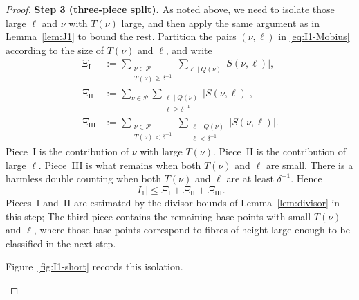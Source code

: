 \begin{proof}
\smallskip\noindent\textbf{Step 3 (three-piece split).}
As noted above, we need to isolate those large $\ell$ and $\nu$ with $T(\nu)$ large, and then apply the same argument as in Lemma~\ref{lem:J1} to bound the rest.
Partition the pairs $(\nu,\ell)$ in \eqref{eq:I1-Mobius} according to the
size of $T(\nu)$ and $\ell$, and write
\begin{align*}
\Xi_{\mathrm I}
&:=\sum_{\substack{\nu\in\mathscr P\\ T(\nu)\geq\delta^{-1}}}
\sum_{\ell\mid Q(\nu)}\bigl|S(\nu,\ell)\bigr|,\\
\Xi_{\mathrm{II}}
&:=\sum_{\nu\in\mathscr P}
\sum_{\substack{\ell\mid Q(\nu)\\ \ell\geq\delta^{-1}}}
\bigl|S(\nu,\ell)\bigr|,\\
\Xi_{\mathrm{III}}
&:=\sum_{\substack{\nu\in\mathscr P\\ T(\nu)<\delta^{-1}}}
\sum_{\substack{\ell\mid Q(\nu)\\ \ell<\delta^{-1}}}
\bigl|S(\nu,\ell)\bigr|.
\end{align*}
Piece~I is the contribution of $\nu$ with large $T(\nu)$.
Piece~II is the contribution of large $\ell$.
Piece~III is what remains when both $T(\nu)$ and $\ell$ are small.
There is a harmless double counting when both $T(\nu)$ and $\ell$ are at
least $\delta^{-1}$.
Hence
\[
|I_1|
\leq
\Xi_{\mathrm I}+\Xi_{\mathrm{II}}+\Xi_{\mathrm{III}}.
\]
Pieces~I and~II are estimated by the divisor bounds of Lemma~\ref{lem:divisor} in this step;
The third piece contains the remaining base points with small $T(\nu)$ and $\ell$, where those base points
correspond to fibres of height large enough to be classified in the next step.

Figure~\ref{fig:I1-short} records this isolation.

\begin{figure}[ht]
\centering
{}
\end{figure}
\end{proof}
